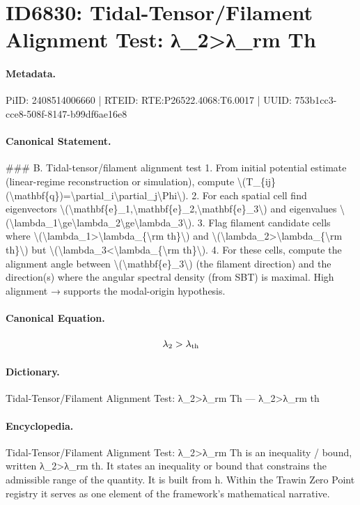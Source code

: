 \section*{ID6830: Tidal-Tensor/Filament Alignment Test: λ\_2>λ\_rm Th}
\paragraph{Metadata.}
PiID: 2408514006660 | RTEID: RTE:P26522.4068:T6.0017 | UUID: 753b1cc3-cce8-508f-8147-b99df6ae16e8

\paragraph{Canonical Statement.}
\#\#\# B. Tidal-tensor/filament alignment test 1. From initial potential estimate (linear-regime reconstruction or simulation), compute \textbackslash{}(T\_\{ij\}(\textbackslash{}mathbf\{q\})=\textbackslash{}partial\_i\textbackslash{}partial\_j\textbackslash{}Phi\textbackslash{}). 2. For each spatial cell find eigenvectors \textbackslash{}(\textbackslash{}mathbf\{e\}\_1,\textbackslash{}mathbf\{e\}\_2,\textbackslash{}mathbf\{e\}\_3\textbackslash{}) and eigenvalues \textbackslash{}(\textbackslash{}lambda\_1\textbackslash{}ge\textbackslash{}lambda\_2\textbackslash{}ge\textbackslash{}lambda\_3\textbackslash{}). 3. Flag filament candidate cells where \textbackslash{}(\textbackslash{}lambda\_1>\textbackslash{}lambda\_\{\textbackslash{}rm th\}\textbackslash{}) and \textbackslash{}(\textbackslash{}lambda\_2>\textbackslash{}lambda\_\{\textbackslash{}rm th\}\textbackslash{}) but \textbackslash{}(\textbackslash{}lambda\_3<\textbackslash{}lambda\_\{\textbackslash{}rm th\}\textbackslash{}). 4. For these cells, compute the alignment angle between \textbackslash{}(\textbackslash{}mathbf\{e\}\_3\textbackslash{}) (the filament direction) and the direction(s) where the angular spectral density (from SBT) is maximal. High alignment → supports the modal-origin hypothesis.

\paragraph{Canonical Equation.}
\[
\lambda_2>\lambda_{\rm th}
\]

\paragraph{Dictionary.}
Tidal-Tensor/Filament Alignment Test: λ\_2>λ\_rm Th — λ\_2>λ\_rm th

\paragraph{Encyclopedia.}
Tidal-Tensor/Filament Alignment Test: λ\_2>λ\_rm Th is an inequality / bound, written λ\_2>λ\_rm th. It states an inequality or bound that constrains the admissible range of the quantity. It is built from h. Within the Trawin Zero Point registry it serves as one element of the framework's mathematical narrative.
